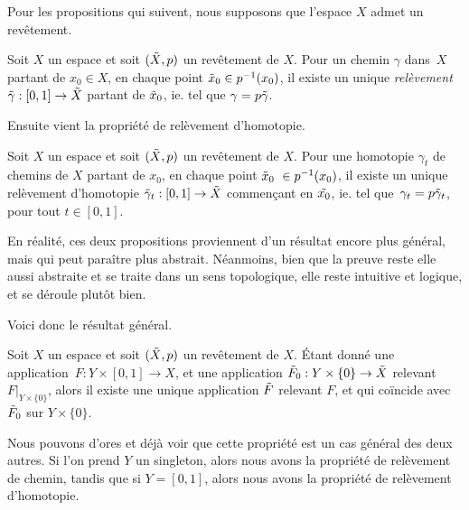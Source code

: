 Pour les propositions qui suivent, nous supposons que l'espace $X$ admet un revêtement.

\begin{proposition}\label{prop:rel-path}
Soit $X$ un espace et soit $(\Tilde{X},p)$ un revêtement de $X$. Pour un chemin $\gamma$ dans~$X$ partant de $x_0\in X$, en chaque point $\Tilde{x}_0\in p^{-1}(x_0)$, il existe un unique \emph{relèvement} $\Tilde{\gamma}:[0,1]\to\Tilde{X}$ partant de $\Tilde{x}_0$, ie. tel que $\gamma=p\Tilde{\gamma}$.
\end{proposition}

Ensuite vient la propriété de relèvement d'homotopie.

\begin{proposition}\label{prop:rel-hom}
Soit $X$ un espace et soit $(\Tilde{X},p)$ un revêtement de $X$. Pour une homotopie $\gamma_t$ de chemins de $X$ partant de $x_0$, en chaque point $\Tilde{x}_0~\in p^{-1}(x_0)$, il existe un unique relèvement d'homotopie $\Tilde{\gamma}_t:[0,1]\to\Tilde{X}$ commençant en $\Tilde{x_0}$, ie. tel que~$\gamma_t=p\Tilde{\gamma}_t$, pour tout $t\in[0,1]$.
\end{proposition}

En réalité, ces deux propositions proviennent d'un résultat encore plus général, mais qui peut paraître plus abstrait. Néanmoins, bien que la preuve reste elle aussi abstraite et se traite dans un sens topologique, elle reste intuitive et logique, et se déroule plutôt bien.

Voici donc le résultat général.

\begin{theorem}
Soit $X$ un espace et soit $(\Tilde{X},p)$ un revêtement de $X$. Étant donné une application~$F:Y\times[0,1]\to X$, et une application $\Tilde{F}_0:Y\times\{0\}\to\Tilde{X}$ relevant~$F|_{Y\times\{0\}}$, alors il existe une unique application $\Tilde{F}$ relevant $F$, et qui coïncide avec $\Tilde{F}_0$ sur $Y\times\{0\}$.
\end{theorem}
Nous pouvons d'ores et déjà voir que cette propriété est un cas général des deux autres. Si l'on prend $Y$ un singleton, alors nous avons la propriété de relèvement de chemin, tandis que si $Y=[0,1]$, alors nous avons la propriété de relèvement d'homotopie.

